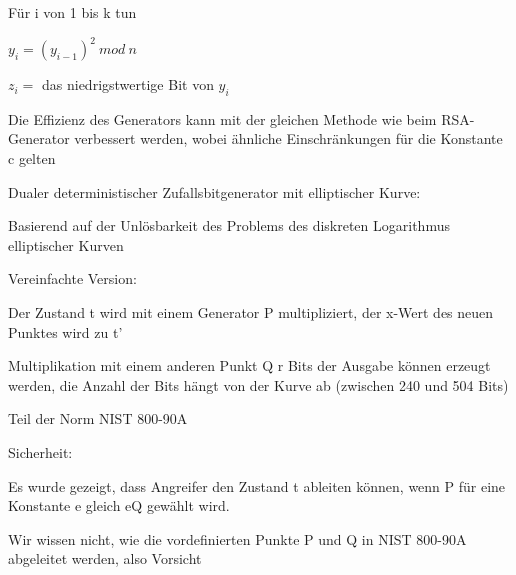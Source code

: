 \documentclass[a4paper]{article}
\begin{document}
\begin{multicols}{3}
\begin{itemize*}
\begin{enumerate*}
                  \item Für i von 1 bis k tun
                  \begin{enumerate*}
                        \item $y_i = (y_{i-1})^2\ mod\ n$
                        \item $z_i =$ das niedrigstwertige Bit von $y_i$
                  \end{enumerate*}
            \end{enumerate*}
            \begin{itemize*}
                  \item Die Effizienz des Generators kann mit der gleichen Methode wie beim RSA-Generator verbessert werden, wobei ähnliche Einschränkungen für die Konstante c gelten
            \end{itemize*}
            \item Dualer deterministischer Zufallsbitgenerator mit elliptischer Kurve:
            \begin{itemize*}
                  \item Basierend auf der Unlösbarkeit des Problems des diskreten Logarithmus elliptischer Kurven
                  \item Vereinfachte Version: %
                  \item Der Zustand t wird mit einem Generator P multipliziert, der x-Wert des neuen Punktes wird zu t'
                  \item Multiplikation mit einem anderen Punkt Q r Bits der Ausgabe können erzeugt werden, die Anzahl der Bits hängt von der Kurve ab (zwischen 240 und 504 Bits)
                  \item Teil der Norm NIST 800-90A
                  \item Sicherheit:
                  \begin{itemize*}
                        \item Es wurde gezeigt, dass Angreifer den Zustand t ableiten können, wenn P für eine Konstante e gleich eQ gewählt wird.
                        \item Wir wissen nicht, wie die vordefinierten Punkte P und Q in NIST 800-90A abgeleitet werden, also Vorsicht
                  \end{itemize*}
            \end{itemize*}
      \end{itemize*}


\end{multicols}
\end{document}
